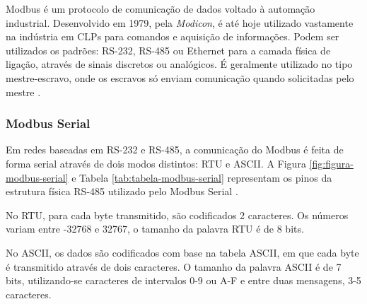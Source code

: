     Modbus é um protocolo de comunicação de dados voltado à automação industrial. Desenvolvido em 1979, pela \textit{Modicon}, é até hoje utilizado vastamente na indústria em \glspl{CLP} para comandos e aquisição de informações. Podem ser utilizados os padrões: RS-232, RS-485 ou Ethernet para a camada física de ligação, através de sinais discretos ou analógicos. É geralmente utilizado no tipo mestre-escravo, onde os escravos só enviam comunicação quando solicitadas pelo mestre  \cite{Modbus}.
    
    \subsubsection{Modbus Serial}
    \label{sec:modbus-serial}

        Em redes baseadas em RS-232 e RS-485, a comunicação do Modbus é feita de forma serial através de dois modos distintos: \gls{RTU} e \gls{ASCII}. A Figura \ref{fig:figura-modbus-serial} e Tabela \ref{tab:tabela-modbus-serial} representam os pinos da estrutura física RS-485 utilizado pelo Modbus Serial \cite{Modbus}.
        
        No \gls{RTU}, para cada byte transmitido, são codificados 2 caracteres. Os números variam entre -32768 e 32767, o tamanho da palavra RTU é de 8 bits.
        
        \begin{table}[h!]	
        	\centering
        \end{table}
        
        No \gls{ASCII}, os dados são codificados com base na tabela \gls{ASCII}, em que cada byte é transmitido através de dois caracteres. O tamanho da palavra ASCII é de 7 bits, utilizando-se caracteres de intervalos 0-9 ou A-F e entre duas mensagens, 3-5 caracteres.
        
        \begin{table}[h!]	
        	\centering
        \end{table}
        

